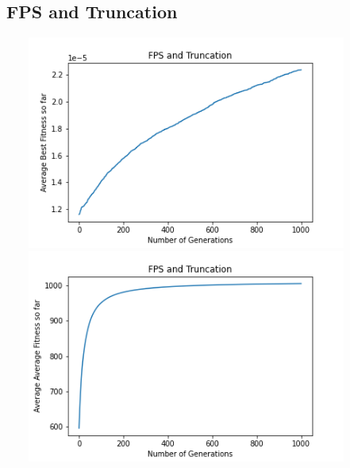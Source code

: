 \documentclass[a4paper]{article}
\begin{document}
\subsection{FPS and Truncation}
\includegraphics[width=12cm, height=7cm]{Graphs/TSP/fps_trunc_bsf.png} \\
\includegraphics[width=12cm, height=7cm]{Graphs/KnapSack/fps_trunc_avg.png} \\
\end{document}
